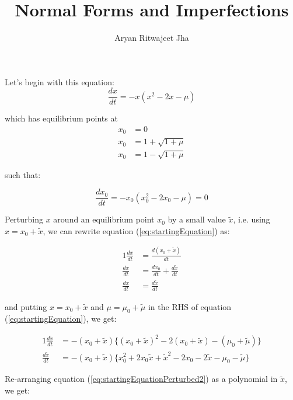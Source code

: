 \documentclass{article}
\begin{document}
	\title{Normal Forms and Imperfections}
	\author{Aryan Ritwajeet Jha}
	\maketitle
	
	Let's begin with this equation: 
	\begin{equation}
		\label{eq:startingEquation}
		\frac{dx}{dt} = -x(x^2-2x-\mu)
	\end{equation}
	
	which has equilibrium points at	
	\begin{align*}
		x_0 &= 0 \\
		x_0 &= 1 +\sqrt{1+\mu} \\
		x_0 &= 1 -\sqrt{1+\mu}
	\end{align*} 
	
	such that:
	
	\begin{equation}
		\label{eq:startingEquationEqui}
		\frac{dx_0}{dt} = -x_0(x_0^2-2x_0-\mu) = 0 
	\end{equation}
	
	
	Perturbing $x$ around an equilibrium point $x_0$ by a small value $\tilde x$, i.e. using $x = x_0 + \tilde x$, we can rewrite equation (\ref{eq:startingEquation}) as:
	
	\begin{alignat}{1}
		\label{eq:startingEquationPerturbed}
		\frac{dx}{dt} &= \frac{d(x_0 + \tilde x)}{dt} \nonumber \\		
		\frac{dx}{dt} &= \frac{dx_0}{dt} + \frac{d \tilde x}{dt} \\		
		\frac{dx}{dt} &= \frac{d \tilde x}{dt} \nonumber
	\end{alignat}
	
	and putting $x = x_0 + \tilde x$ and $\mu = \mu_0 + \tilde{\mu}$ in the RHS of equation (\ref{eq:startingEquation}), we get:
	
	\begin{alignat}{1}
		\label{eq:startingEquationPerturbed2}
		\frac{d\tilde x}{dt} &= -(x_0+\tilde{x})\{(x_0+\tilde{x})^2-2(x_0+\tilde{x})-(\mu_0+\tilde{\mu})\} \nonumber \\		
		\frac{d\tilde x}{dt} &= -(x_0+\tilde{x})\{x_0^2 + 2x_0\tilde{x} +\tilde{x}^2 -2x_0 -2\tilde{x}-\mu_0 -\tilde{\mu}\}		
	\end{alignat}

Re-arranging equation (\ref{eq:startingEquationPerturbed2}) as a polynomial in $\tilde{x}$, we get:
\end{document}

